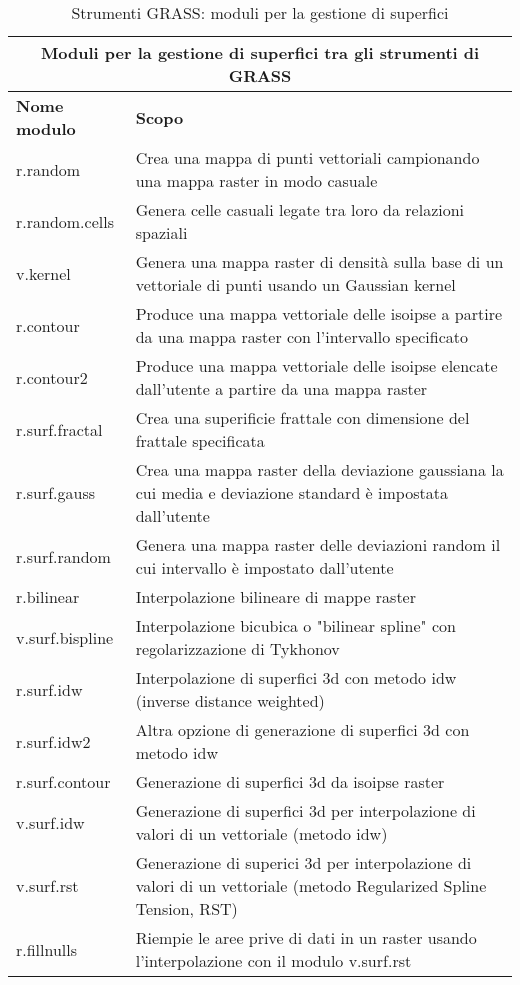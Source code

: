 \begin{table}[ht]
\centering
\caption{Strumenti GRASS: moduli per la gestione di superfici}\medskip
 \begin{tabular}{|p{4cm}|p{12cm}|}
  \hline \multicolumn{2}{|c|}{\textbf{Moduli per la gestione di superfici tra gli strumenti di GRASS}} \\
  \hline \textbf{Nome modulo} & \textbf{Scopo} \\
  \hline r.random & Crea una mappa di punti vettoriali campionando una mappa raster in modo casuale \\
  \hline r.random.cells & Genera celle casuali legate tra loro da relazioni spaziali \\
  \hline v.kernel & Genera una mappa raster di densità sulla base di un vettoriale di punti usando un Gaussian kernel \\
  \hline r.contour & Produce una mappa vettoriale delle isoipse a partire da una mappa raster con l'intervallo specificato \\
  \hline r.contour2 & Produce una mappa vettoriale delle isoipse elencate dall'utente a partire da una mappa raster \\
  \hline r.surf.fractal & Crea una superificie frattale con dimensione del frattale specificata \\
  \hline r.surf.gauss & Crea una mappa raster della deviazione gaussiana la cui media e deviazione standard è impostata dall'utente \\
  \hline r.surf.random & Genera una mappa raster delle deviazioni random il cui intervallo è impostato dall'utente \\
  \hline r.bilinear & Interpolazione bilineare di mappe raster \\
  \hline v.surf.bispline & Interpolazione bicubica o "bilinear spline" con regolarizzazione di Tykhonov \\
  \hline r.surf.idw & Interpolazione di superfici 3d con metodo idw (inverse distance weighted) \\
  \hline r.surf.idw2 & Altra opzione di generazione di superfici 3d con metodo idw \\
  \hline r.surf.contour & Generazione di superfici 3d da isoipse raster \\
  \hline v.surf.idw & Generazione di superfici 3d per interpolazione di valori di un vettoriale (metodo idw) \\
  \hline v.surf.rst & Generazione di superici 3d per interpolazione di valori di un vettoriale (metodo Regularized Spline Tension, RST) \\
  \hline r.fillnulls & Riempie le aree prive di dati in un raster usando l'interpolazione con il modulo v.surf.rst \\
\hline
\end{tabular}
\end{table}

